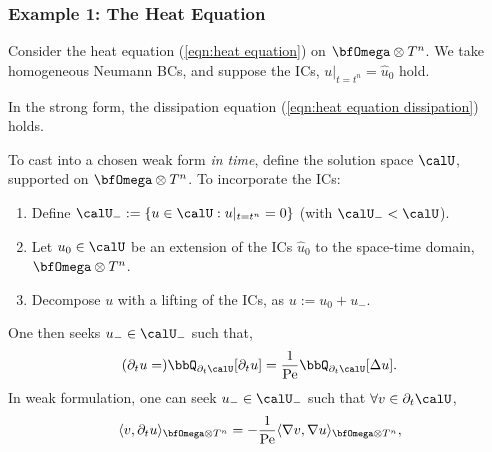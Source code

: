 \subsubsection{Example 1: The Heat Equation}
    \begin{example}
        Consider the heat equation (\ref{eqn:heat equation}) on $\bfOmega\otimes T^{n}$. We take homogeneous Neumann BCs, and suppose the ICs, $u|_{t = t^{n}}  =  \widehat{u}_{0}$ hold.
        
        In the strong form, the dissipation equation (\ref{eqn:heat equation dissipation}) holds.

        To cast into a chosen weak form \emph{in time}, define the solution space $\calU$, supported on $\bfOmega\otimes T^{n}$. To incorporate the ICs:
        \begin{enumerate}
            \item  Define $\calU_{-}  :=  \{u  \in  \calU  :  u|_{t = t^{n}}  =  0\}$ (with $\calU_{-}  <  \calU$).
            \item  Let $u_{0}  \in  \calU$ be an extension of the ICs $\widehat{u}_{0}$ to the space-time domain, $\bfOmega\otimes T^{n}$.
            \item  Decompose $u$ with a lifting of the ICs, as $u  :=  u_{0} + u_{-}$.
        \end{enumerate}
        One then seeks $u_{-}  \in  \calU_{-}$ such that,
        \begin{equation}
            (\partial_{t}u  =)  \bbQ_{\partial_{t}\calU}[\partial_{t}u]  =  \frac{1}{\rmPe}\bbQ_{\partial_{t}\calU}[\Delta u].
        \end{equation}
        In weak formulation, one can seek $u_{-}  \in  \calU_{-}$ such that $\forall  v  \in  \partial_{t}\calU$,
        \begin{equation}\label{eqn:heat equation weak form}
            \langle v, \partial_{t}u\rangle_{\bfOmega\otimes T^{n}}  =   - \frac{1}{\rmPe}\langle\nabla v, \nabla u\rangle_{\bfOmega\otimes T^{n}},
        \end{equation}
        

\end{example}
